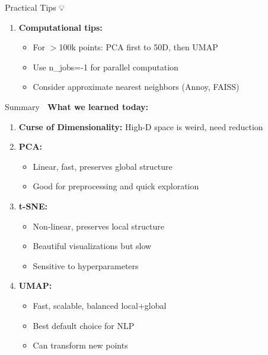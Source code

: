 \documentclass[aspectratio=169]{beamer}
\begin{document}
\begin{frame}[shrink=10]{Practical Tips 💡}
\begin{enumerate}
    \item \textbf{Computational tips:}
    \begin{itemize}\setlength{\itemsep}{0pt}
        \item For $>$100k points: PCA first to 50D, then UMAP
        \item Use n\_jobs=-1 for parallel computation
        \item Consider approximate nearest neighbors (Annoy, FAISS)
    \end{itemize}
\end{enumerate}
\end{frame}

\begin{frame}[shrink=10]{Summary 🎯}
\textbf{What we learned today:}

\begin{enumerate}\setlength{\itemsep}{0pt}
    \item \textbf{Curse of Dimensionality:} High-D space is weird, need reduction

    \item \textbf{PCA:}
    \begin{itemize}\setlength{\itemsep}{0pt}
        \item Linear, fast, preserves global structure
        \item Good for preprocessing and quick exploration
    \end{itemize}

    \item \textbf{t-SNE:}
    \begin{itemize}\setlength{\itemsep}{0pt}
        \item Non-linear, preserves local structure
        \item Beautiful visualizations but slow
        \item Sensitive to hyperparameters
    \end{itemize}

    \item \textbf{UMAP:}
    \begin{itemize}\setlength{\itemsep}{0pt}
        \item Fast, scalable, balanced local+global
        \item Best default choice for NLP
        \item Can transform new points
    \end{itemize}


\end{enumerate}
\end{frame}
\end{document}

